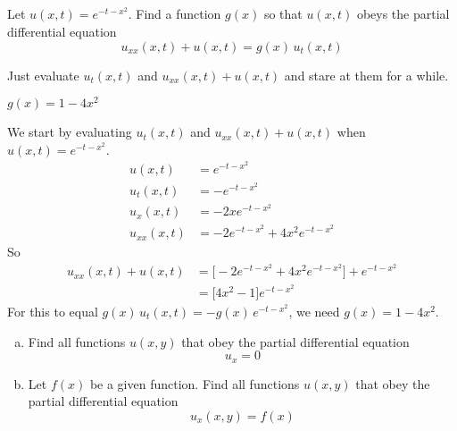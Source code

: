 


\subsection*{\Conceptual}

\begin{question}
Let $u(x,t)= e^{-t-x^2}$. Find a function $g(x)$ so that $u(x,t)$
obeys the partial differential equation
\begin{equation*}
u_{xx}(x,t)+u(x,t) = g(x)\, u_t(x,t)
\end{equation*}
\end{question}

\begin{hint}
Just evaluate $u_t(x,t)$ and $u_{xx}(x,t)+u(x,t)$ and stare at them for a while.
\end{hint}

\begin{answer}
$g(x) = 1-4x^2$
\end{answer}

\begin{solution}
We start by evaluating  $u_t(x,t)$ and $u_{xx}(x,t)+u(x,t)$ when
$u(x,t)= e^{-t-x^2}$.
\begin{align*}
u(x,t)&= e^{-t-x^2}
\\
u_t(x,t)&= -e^{-t-x^2}
\\
u_x(x,t)&= -2x e^{-t-x^2}
\\
u_{xx}(x,t)&= -2 e^{-t-x^2} +4x^2 e^{-t-x^2}
\end{align*}
So
\begin{align*}
u_{xx}(x,t)+u(x,t) &= \big[-2 e^{-t-x^2} +4x^2 e^{-t-x^2}\big] +e^{-t-x^2} \\
                   &= \big[4x^2-1]e^{-t-x^2}
\end{align*}
For this to equal $g(x)\, u_t(x,t) = -g(x)\, e^{-t-x^2}$, we need
$g(x) = 1-4x^2$.

\end{solution}

\begin{question}
\begin{enumerate}[(a)]
\item
Find all functions $u(x,y)$ that obey the partial differential equation
\begin{equation*}
u_x=0
\end{equation*}

\item 
Let $f(x)$ be a given function.
Find all functions $u(x,y)$ that obey the partial differential equation
\begin{equation*}
u_x(x,y)= f(x)
\end{equation*}

\end{enumerate}

\end{question}

